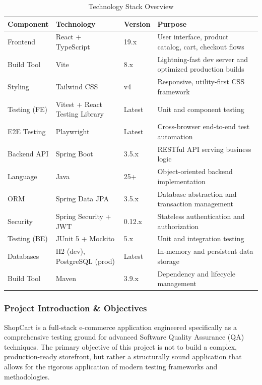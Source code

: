 \documentclass[11pt,a4paper]{article}
\begin{document}
\begin{table}[H]
\centering
\small
\begin{tabularx}{\textwidth}{|l|X|l|X|}
\hline
\textbf{Component} & \textbf{Technology} & \textbf{Version} & \textbf{Purpose} \\
\hline
Frontend & React + TypeScript & 19.x & User interface, product catalog, cart, checkout flows \\
\hline
Build Tool & Vite & 8.x & Lightning-fast dev server and optimized production builds \\
\hline
Styling & Tailwind CSS & v4 & Responsive, utility-first CSS framework \\
\hline
Testing (FE) & Vitest + React Testing Library & Latest & Unit and component testing \\
\hline
E2E Testing & Playwright & Latest & Cross-browser end-to-end test automation \\
\hline
Backend API & Spring Boot & 3.5.x & RESTful API serving business logic \\
\hline
Language & Java & 25+ & Object-oriented backend implementation \\
\hline
ORM & Spring Data JPA & 3.5.x & Database abstraction and transaction management \\
\hline
Security & Spring Security + JWT & 0.12.x & Stateless authentication and authorization \\
\hline
Testing (BE) & JUnit 5 + Mockito & 5.x & Unit and integration testing \\
\hline
Databases & H2 (dev), PostgreSQL (prod) & Latest & In-memory and persistent data storage \\
\hline
Build Tool & Maven & 3.9.x & Dependency and lifecycle management \\
\hline
\end{tabularx}
\caption{Technology Stack Overview}
\end{table}

\subsubsection{Project Introduction \& Objectives}

ShopCart is a full-stack e-commerce application engineered specifically as a comprehensive testing ground for advanced Software Quality Assurance (QA) techniques. The primary objective of this project is not to build a complex, production-ready storefront, but rather a structurally sound application that allows for the rigorous application of modern testing frameworks and methodologies.
\end{document}
